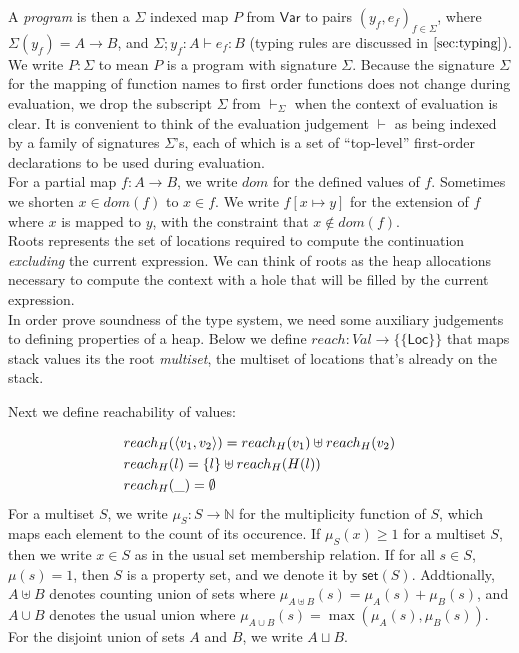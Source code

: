 \documentclass[11pt]{article}
\newcommand{\ms}[1]{\ensuremath{\mathsf{#1}}}
\newcounter{rule}
\theoremstyle{definition}
\begin{document}
\noindent
A \emph{program} is then a $\Sigma$ indexed map $P$ from $\ms{Var}$ to pairs $(y_f,e_f)_{f \in \Sigma}$, where $\Sigma(y_f) = A \to B$, and $\Sigma;y_f : A \vdash e_f : B$ (typing rules are discussed in $\ref{sec:typing}$). We write $P : \Sigma$ to mean $P$ is a program with signature $\Sigma$. Because the signature $\Sigma$ for the mapping of function names to first order functions does not change during evaluation, we drop the subscript $\Sigma$ from $\vdash_{\Sigma}$ when the context of evaluation is clear. It is convenient to think of the evaluation judgement $\vdash$ as being indexed by a family of signatures $\Sigma$'s, each of which is a set of ``top-level'' first-order declarations to be used during evaluation.\\

\noindent 
For a partial map $f : A \to B$, we write $dom$ for the defined values of $f$. Sometimes we shorten $x \in dom(f)$ to $x \in f$. We write $f[x \mapsto y]$ for the extension of $f$ where $x$ is mapped to $y$, with the constraint that $x \notin dom(f)$. \\

\noindent
Roots represents the set of locations required to compute the continuation \emph{excluding} the current expression.
We can think of roots as the heap allocations necessary to compute the context with a hole that will be filled
by the current expression.\\

\noindent
In order prove soundness of the type system, we need some auxiliary judgements to defining properties of a heap. Below we define $reach : Val \to \{\{\ms{Loc}\}\}$ that maps stack values its the root \emph{multiset}, the multiset of locations that's already on the stack. 

\noindent
Next we define reachability of values:

\begin{align*}
&reach_H(\langle v_1, v_2\rangle) = reach_H(v_1) \uplus reach_H(v_2)\\
&reach_H(l) = \{l\} \uplus reach_H(H(l))\\
&reach_H(\_) = \emptyset
\end{align*}
For a multiset $S$, we write $\mu_S : S \to \mathbb{N}$ for the multiplicity function of $S$, which maps each element to the count of its occurence. If $\mu_S(x) \ge 1$ for a multiset $S$, then we write $x \in S$ as in the usual set membership relation. If for all  $s \in S$, $\mu(s) = 1$, then $S$ is a property set, and we denote it by $\ms{set}(S)$. Addtionally, $A \uplus B$ denotes counting union of sets where $\mu_{A \uplus B} (s) = \mu_A (s) + \mu_B (s)$, and $A \cup B$ denotes the usual union where $\mu_{A \cup B}(s) = \max{(\mu_A(s),\mu_B(s))}$. For the disjoint union of sets $A$ and $B$, we write $A \sqcup B$.\\
\end{document}
